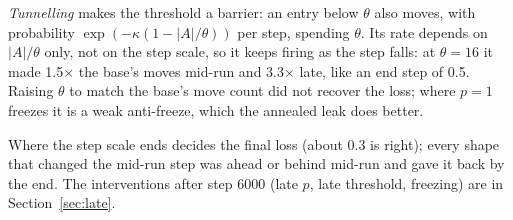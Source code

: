 \documentclass[10pt,twocolumn]{article}
\begin{document}
\emph{Tunnelling} makes the threshold a barrier: an entry below $\theta$ also moves, with probability
$\exp(-\kappa(1-|A|/\theta))$ per step, spending $\theta$. Its rate depends on $|A|/\theta$ only, not on the step
scale, so it keeps firing as the step falls: at $\theta=16$ it made 1.5$\times$ the base's moves mid-run and
3.3$\times$ late, like an end step of 0.5. Raising $\theta$ to match the base's move count did not recover the loss;
where $p=1$ freezes it is a weak anti-freeze, which the annealed leak does better.

Where the step scale ends decides the final loss (about 0.3 is right); every shape that changed the mid-run step was
ahead or behind mid-run and gave it back by the end. The interventions after step 6000 (late $p$, late threshold,
freezing) are in Section~\ref{sec:late}.
\end{document}
